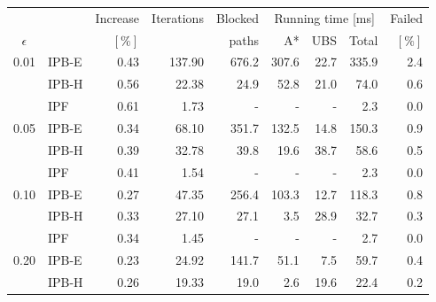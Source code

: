 \begin{tabular}{clrrrrrrr}
\toprule
            & & Increase & Iterations & Blocked & \multicolumn{3}{c}{Running time [ms]} & Failed \\ \cmidrule(lr){6-8}
 $\epsilon$ & &   $[\%]$ &            &   paths & A* & UBS & Total                      & $[\%]$ \\
\midrule
\multirow{3}{*}{0.01} & IPB-E &                     0.43 &          137.90 &                676.2 &                      307.6 &               22.7 &            335.9 &     2.4 \\
                      & IPB-H &                     0.56 &           22.38 &                 24.9 &                       52.8 &               21.0 &             74.0 &     0.6 \\
                      & IPF &                     0.61 &            1.73 &                    - &                          - &                  - &              2.3 &     0.0 \\[2pt]
\multirow{3}{*}{0.05} & IPB-E &                     0.34 &           68.10 &                351.7 &                      132.5 &               14.8 &            150.3 &     0.9 \\
                      & IPB-H &                     0.39 &           32.78 &                 39.8 &                       19.6 &               38.7 &             58.6 &     0.5 \\
                      & IPF &                     0.41 &            1.54 &                    - &                          - &                  - &              2.3 &     0.0 \\[2pt]
\multirow{3}{*}{0.10} & IPB-E &                     0.27 &           47.35 &                256.4 &                      103.3 &               12.7 &            118.3 &     0.8 \\
                      & IPB-H &                     0.33 &           27.10 &                 27.1 &                        3.5 &               28.9 &             32.7 &     0.3 \\
                      & IPF &                     0.34 &            1.45 &                    - &                          - &                  - &              2.7 &     0.0 \\[2pt]
\multirow{3}{*}{0.20} & IPB-E &                     0.23 &           24.92 &                141.7 &                       51.1 &                7.5 &             59.7 &     0.4 \\
                      & IPB-H &                     0.26 &           19.33 &                 19.0 &                        2.6 &               19.6 &             22.4 &     0.2 \\

\end{tabular}
